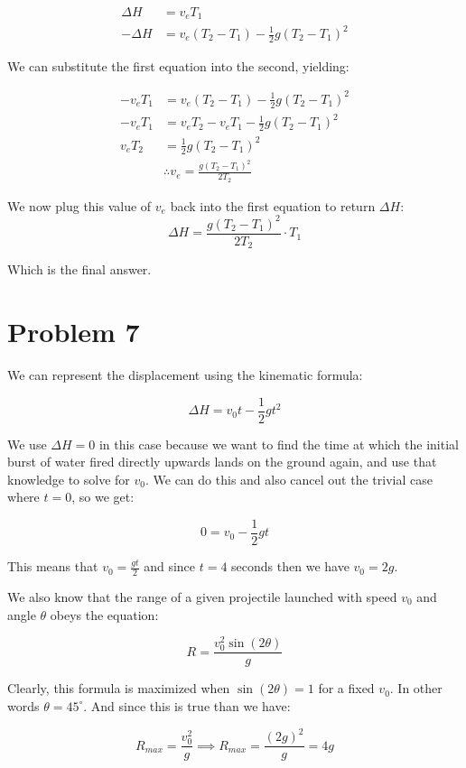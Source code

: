 \documentclass{article}
\theoremstyle{definition}
\numberwithin{equation}{section}
\numberwithin{definition}{section}
\begin{document}
	\begin{align}
		\Delta H &= v_e T_1\\
		-\Delta H &= v_e(T_2-T_1) - \frac{1}{2}g(T_2 - T_1)^2
	\end{align}

We can substitute the first equation into the second, yielding:

\begin{align*}
	-v_eT_1 &= v_e(T_2 - T_1) - \frac{1}{2}g(T_2-T_1)^2\\
	-v_eT_1 &= v_eT_2 - v_eT_1 - \frac{1}{2}g(T_2 - T_1)^2\\
	v_eT_2 &= \frac{1}{2}g(T_2 - T_1)^2\\
	&\therefore v_e = \frac{g(T_2- T_1)^2}{2T_2}
\end{align*}

We now plug this value of $v_e$ back into the first equation to return $\Delta H$:
\[ \boxed{\Delta H = \frac{g(T_2-T_1)^2}{2T_2} \cdot T_1}\]

Which is the final answer.

\section{Problem 7}

We can represent the displacement using the kinematic formula:

\[ \Delta H = v_0t - \frac{1}{2}gt^2\]

We use $\Delta H = 0$ in this case because we want to find the time at which the initial burst of water fired directly upwards lands on the ground again, and use that knowledge to solve for $v_0$. We can do this and also cancel out the trivial case where $t=0$, so we get:

\[ 0 = v_0 - \frac{1}{2}gt\]

This means that $v_0 = \frac{gt}{2}$ and since $t = 4$ seconds then we have $v_0 = 2g$. 

\medskip

We also know that the range of a given projectile launched with speed $v_0$ and angle $\theta$ obeys the equation:

\[ R = \frac{v_0^2 \sin(2\theta)}{g}\]

Clearly, this formula is maximized when $\sin(2\theta) = 1$ for a fixed $v_0$. In other words $\theta = 45^\circ$. And since this is true than we have:

\[R_{max} = \frac{v_0^2}{g} \implies R_{max} = \frac{(2g)^2}{g} = 4g\]
\end{document}
